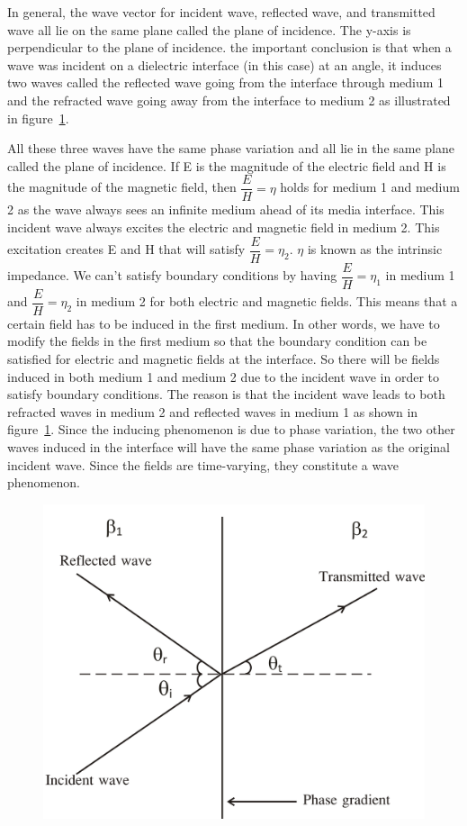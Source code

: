 In general, the wave vector for incident wave, reflected wave, and transmitted wave all lie on the same plane called the plane of incidence. The y-axis is perpendicular to the plane of incidence. the important conclusion is that when a wave was incident on a dielectric interface (in this case) at an angle, it induces two waves called the reflected wave going from the interface through medium 1  and the refracted wave going away from the interface to medium 2 as illustrated in figure~\ref{fig:group30e}.

All these three waves have the same phase variation and all lie in the same plane called the plane of incidence. If E is the magnitude of the electric field and H is the magnitude of the magnetic field, then $\dfrac{E}{H}=\eta$ holds for medium 1 and medium 2 as the wave always sees an infinite medium ahead of its media interface. This incident wave always excites the electric and magnetic field in medium 2. This excitation creates E and H that will satisfy $\dfrac{E}{H}=\eta_2$. $\eta$ is known as the intrinsic impedance. We can't satisfy boundary conditions by having $\dfrac{E}{H}=\eta_1$ in medium 1 and $\dfrac{E}{H}=\eta_2$ in medium 2 for both electric and magnetic fields. This means that a certain field has to be induced in the first medium. In other words, we have to modify the fields in the first medium so that the boundary condition can be satisfied for electric and magnetic fields at the interface. So there will be fields induced in both medium 1 and medium 2 due to the incident wave in order to satisfy boundary conditions. The reason is that the incident wave leads to both refracted waves in medium 2 and reflected waves in medium 1 as shown in figure~\ref{fig:group30e}. Since the inducing phenomenon is due to phase variation, the two other waves induced in the interface will have the same phase variation as the original incident wave. Since the fields are time-varying, they constitute a wave phenomenon.
\begin{figure}[h]
\centering
\includegraphics[width=.7\linewidth]{./graphics/group30e}
\caption{}
\label{fig:group30e}
\end{figure}

